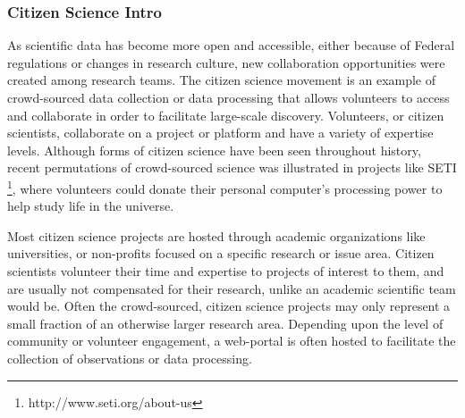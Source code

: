 \subsubsection{Citizen Science Intro}

As scientific data has become more open and accessible, either because of Federal regulations or changes in research culture, new collaboration opportunities were created among research teams. The citizen science movement is an example of crowd-sourced data collection or data processing that allows volunteers to access and collaborate in order to facilitate large-scale discovery. Volunteers, or citizen scientists, collaborate on a project or platform and have a variety of expertise levels. Although forms of citizen science have been seen throughout history, recent permutations of crowd-sourced science was illustrated in projects like SETI \footnote{http://www.seti.org/about-us}, where volunteers could donate their personal computer's processing power to help study life in the universe. 

Most citizen science projects are hosted through academic organizations like universities, or non-profits focused on a specific research or issue area. Citizen scientists volunteer their time and expertise to projects of interest to them, and are usually not compensated for their research, unlike an academic scientific team would be. Often the crowd-sourced, citizen science projects may only represent a small fraction of an otherwise larger research area. Depending upon the level of community or volunteer engagement, a web-portal is often hosted to facilitate the collection of observations or data processing.